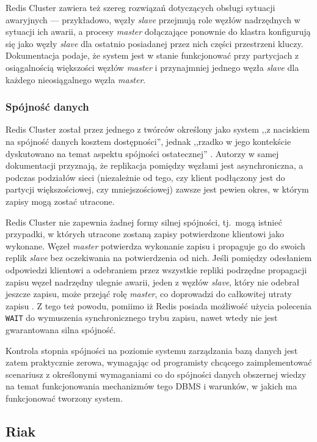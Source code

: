 Redis Cluster zawiera też szereg rozwiązań dotyczących obsługi sytuacji awaryjnych --- przykładowo, węzły \textit{slave} przejmują role węzłów nadrzędnych w sytuacji ich awarii, a procesy \textit{master} dołączające ponownie do klastra konfigurują się jako węzły \textit{slave} dla ostatnio posiadanej przez nich części przestrzeni kluczy. Dokumentacja podaje, że system jest w stanie funkcjonować przy partycjach z osiągalnością większości węzłów \textit{master} i przynajmniej jednego węzła \textit{slave} dla każdego nieosiągalnego węzła \textit{master}.

\subsubsection*{Spójność danych}

Redis Cluster został przez jednego z twórców określony jako system ,,z naciskiem na spójność danych kosztem dostępności'', jednak ,,rzadko w jego kontekście dyskutowano na temat aspektu spójności ostatecznej'' \cite{antirez}.  Autorzy w samej dokumentacji przyznają, że replikacja pomiędzy węzłami jest asynchroniczna, a podczas podziałów sieci (niezależnie od tego, czy klient podłączony jest do partycji większościowej, czy mniejszościowej) zawsze jest pewien okres, w którym zapisy mogą zostać utracone.

Redis Cluster nie zapewnia żadnej formy silnej spójności, tj.\ mogą istnieć przypadki, w których utracone zostaną zapisy potwierdzone klientowi jako wykonane. Węzeł \textit{master} potwierdza wykonanie zapisu i propaguje go do swoich replik \textit{slave} bez oczekiwania na potwierdzenia od nich. Jeśli pomiędzy odesłaniem odpowiedzi klientowi a odebraniem przez wszystkie repliki podrzędne propagacji zapisu węzeł nadrzędny ulegnie awarii, jeden z węzłów \textit{slave}, który nie odebrał jeszcze zapisu, może przejąć rolę \textit{master}, co doprowadzi do całkowitej utraty zapisu \cite{redisclustertut}. Z tego też powodu, pomiimo iż Redis posiada możliwość użycia polecenia \texttt{WAIT} do wymuszenia synchronicznego trybu zapisu, nawet wtedy nie jest gwarantowana silna spójność.

Kontrola stopnia spójności na poziomie systemu zarządzania bazą danych jest zatem praktycznie zerowa, wymagając od programisty chcącego zaimplementować scenariusz z określonymi wymaganiami co do spójności danych obszernej wiedzy na temat funkcjonowania mechanizmów tego DBMS i warunków, w jakich ma funkcjonować tworzony system.

\subsection{Riak}


